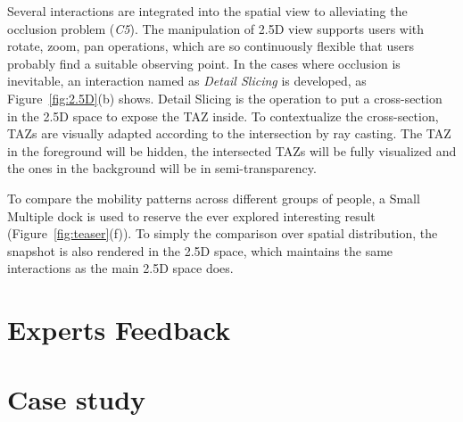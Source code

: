 Several interactions are integrated into the spatial view to alleviating the occlusion problem (\textit{C5}). The manipulation of 2.5D view supports users with rotate, zoom, pan operations, which are so continuously flexible that users probably find a suitable observing point. In the cases where occlusion is inevitable, an interaction named as \textit{Detail Slicing} is developed, as Figure~\ref{fig:2.5D}(b) shows. Detail Slicing is the operation to put a cross-section in the 2.5D space to expose the TAZ inside. To contextualize the cross-section, TAZs are visually adapted according to the intersection by ray casting. The TAZ in the foreground will be hidden, the intersected TAZs will be fully visualized and the ones in the background will be in semi-transparency.


To compare the mobility patterns across different groups of people, a Small Multiple dock is used to reserve the ever explored interesting result (Figure~\ref{fig:teaser}(f)). To simply the comparison over spatial distribution, the snapshot is also rendered in the 2.5D space, which maintains the same interactions as the main 2.5D space does.





\section{Experts Feedback}





\section{Case study}

